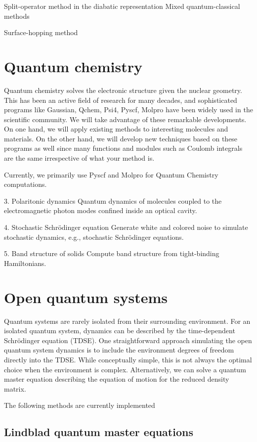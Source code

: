 \documentclass[a4paper,12pt]{book}
\begin{document}
Split-operator method in the diabatic representation
Mixed quantum-classical methods

Surface-hopping method
\chapter{Quantum chemistry}
Quantum chemistry solves the electronic structure given the nuclear geometry. This has been an active field of research for many decades, and sophisticated programs like Gaussian, Qchem, Psi4, Pyscf, Molpro have been widely used in the scientific community. We will take advantage of these remarkable developments. On one hand, we will apply existing methods to interesting molecules and materials. On the other hand, we will develop new techniques based on these programs as well since many functions and modules such as Coulomb integrals are the same irrespective of what your method is.

Currently, we primarily use Pyscf and Molpro for Quantum Chemistry computations.

3. Polaritonic dynamics
Quantum dynamics of molecules coupled to the electromagnetic photon modes confined inside an optical cavity.

4. Stochastic Schrödinger equation
Generate white and colored noise to simulate stochastic dynamics, e.g., stochastic Schrödinger equations.

5. Band structure of solids
Compute band structure from tight-binding Hamiltonians.

\chapter{Open quantum systems}
Quantum systems are rarely isolated from their surrounding environment. For an isolated quantum system, dynamics can be described by the time-dependent Schrödinger equation (TDSE). One straightforward approach simulating the open quantum system dynamics is to include the environment degrees of freedom directly into the TDSE. While conceptually simple, this is not always the optimal choice when the environment is complex. Alternatively, we can solve a quantum master equation describing the equation of motion for the reduced density matrix.

The following methods are currently implemented



\section{Lindblad quantum master equations}
\end{document}
